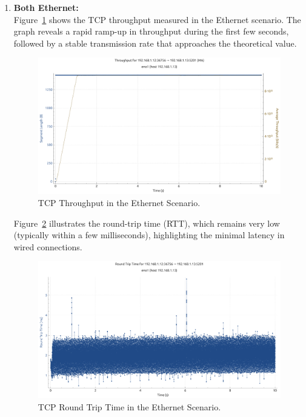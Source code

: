         \begin{enumerate}

            \item \textbf{Both Ethernet:} \\
                Figure~\ref{fig:throughput-eth-tcp} shows the TCP throughput measured in the Ethernet scenario. The graph reveals a rapid ramp-up in throughput during the first few seconds, followed by a stable transmission rate that approaches the theoretical value.
                
                \begin{figure}[ht]
                    \centering
                    \includegraphics[width=0.9\columnwidth]{images/graphs/Throughput/Throughput_ETH_TCP.pdf}
                    \caption{TCP Throughput in the Ethernet Scenario.}
                    \label{fig:throughput-eth-tcp}
                \end{figure}

                Figure~\ref{fig:rtt-eth-tcp} illustrates the round-trip time (RTT), which remains very low (typically within a few milliseconds), highlighting the minimal latency in wired connections. 
                
                \begin{figure}[ht]
                    \centering
                    \includegraphics[width=0.9\columnwidth]{images/graphs/RTT/RTT_ETH_TCP.pdf}
                    \caption{TCP Round Trip Time in the Ethernet Scenario.}
                    \label{fig:rtt-eth-tcp}
                \end{figure}


\end{enumerate}

